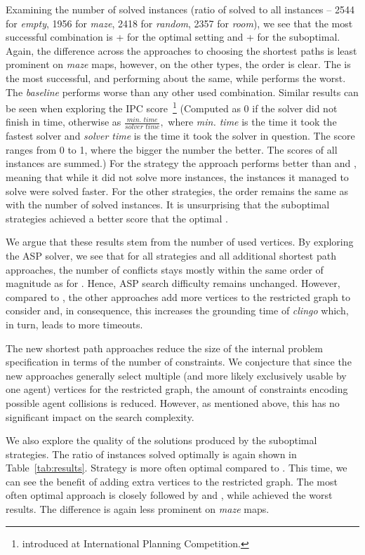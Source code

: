 Examining the number of solved instances (ratio of solved to all instances -- 2544 for \emph{empty}, 1956 for \emph{maze}, 2418 for \emph{random}, 2357 for \emph{room}), we see that the most successful combination is \ssp{} + \pss{} for the optimal setting and \ssc{} + \pss{} for the suboptimal. Again, the difference across the approaches to choosing the shortest paths is least prominent on \emph{maze} maps, however, on the other types, the order is clear. The \pss{} is the most successful, \psd{} and \psr{} performing about the same, while \psa{} performs the worst. The \emph{baseline} \ssb{} performs worse than any other used combination.
Similar results can be seen when exploring the IPC score~\footnote{introduced at International Planning Competition.} (Computed as 0 if the solver did not finish in time, otherwise as $\frac{\textit{min. time}}{\textit{solver time}},$ where \textit{min. time} is the time it took the fastest solver and \textit{solver time} is the time it took the solver in question. The score ranges from 0 to 1, where the bigger the number the better. The scores of all instances are summed.) For the \ssp{} strategy the \psa{} approach performs better than \psd{} and \psr{}, meaning that while it did not solve more instances, the instances it managed to solve were solved faster. For the other strategies, the order remains the same as with the number of solved instances. It is unsurprising that the suboptimal strategies achieved a better score that the optimal \ssp{}.

We argue that these results stem from the number of used vertices. By exploring the ASP solver, we see that for all strategies and all additional shortest path approaches, the number of conflicts stays mostly within the same order of magnitude as for \pss{}. Hence, ASP search difficulty remains unchanged.
However, compared to \pss{}, the other approaches add more vertices to the restricted graph to consider and, in consequence, this increases the grounding time of \emph{clingo} which, in turn, leads to more timeouts.

The new shortest path approaches reduce the size of the internal problem specification in terms of the number of constraints.
We conjecture that since the new approaches generally select multiple (and more likely exclusively usable by one agent) vertices for the restricted graph, the amount of constraints encoding possible agent collisions is reduced. However, as mentioned above, this has no significant impact on the search complexity.

We also explore the quality of the solutions produced by the suboptimal strategies. The ratio of instances solved optimally is again shown in Table~\ref{tab:results}. Strategy \ssc{} is more often optimal compared to \ssm{}. This time, we can see the benefit of adding extra vertices to the restricted graph. The most often optimal approach is \psa{} closely followed by \psr{} and \psd{}, while \pss{} achieved the worst results. The difference is again less prominent on \emph{maze} maps.

